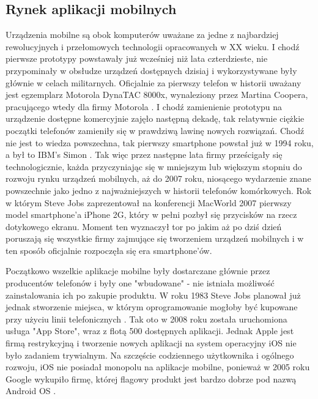 \documentclass[12pt, a4paper]{article}
\begin{document}
\begin{sloppypar}
{  \subsection{Rynek aplikacji mobilnych}
  {
    Urządzenia mobilne są obok komputerów uważane za jedne z najbardziej rewolucyjnych
    i przełomowych technologii opracowanych w XX wieku. I chodź pierwsze prototypy 
    powstawały już wcześniej niż lata czterdzieste, nie przypominały w obsłudze urządzeń
    dostępnych dzisiaj i wykorzystywane były głównie w celach militarnych.
    Oficjalnie za pierwszy telefon w historii uważany jest egzemplarz Motorola 
    DynaTAC 8000x, wynaleziony przez Martina Coopera, pracującego wtedy dla firmy 
    Motorola \cite{history1}. I chodź zamienienie prototypu na urządzenie dostępne
    komercyjnie zajęło następną dekadę, tak relatywnie ciężkie początki telefonów
    zamieniły się w prawdziwą lawinę nowych rozwiązań. Chodź nie jest to wiedza
    powszechna, tak pierwszy smartphone powstał już w 1994 roku, a był to IBM's Simon
    \cite{history2}. Tak więc przez następne lata firmy prześcigały się technologicznie,
    każda przyczyniając się w mniejszym lub większym stopniu do rozwoju rynku urządzeń
    mobilnych, aż do 2007 roku, niosącego wydarzenie znane powszechnie jako jedno 
    z najważniejszych w historii telefonów komórkowych. Rok w którym Steve Jobs 
    zaprezentował na konferencji MacWorld 2007 pierwszy model smartphone'a iPhone 2G,
    który w pełni pozbył się przycisków na rzecz dotykowego ekranu. Moment ten wyznaczył
    tor po jakim aż po dziś dzień poruszają się wszystkie firmy zajmujące się tworzeniem
    urządzeń mobilnych i w ten sposób oficjalnie rozpoczęła się era smartphone'ów.

    Początkowo wszelkie aplikacje mobilne były dostarczane głównie przez producentów
    telefonów i były one "wbudowane" - nie istniała możliwość zainstalowania
    ich po zakupie produktu. W roku 1983 Steve Jobs planował już jednak stworzenie
    miejsca, w którym oprogramowanie mogłoby być kupowane przy użyciu linii
    telefonicznych \cite{history4}. Tak oto w 2008 roku została uruchomiona usługa
    "App Store", wraz z flotą 500 dostępnych aplikacji. Jednak Apple jest firmą
    restrykcyjną i tworzenie nowych aplikacji na system operacyjny iOS nie było 
    zadaniem trywialnym. Na szczęście codziennego użytkownika i ogólnego rozwoju, 
    iOS nie posiadał monopolu na aplikacje mobilne, ponieważ w 2005 roku Google
    wykupiło firmę, której flagowy produkt jest bardzo dobrze pod nazwą Android OS
    \cite{history3}.

}}
\end{sloppypar}
\end{document}
